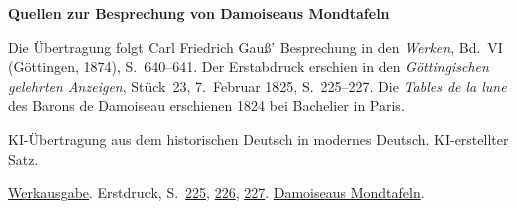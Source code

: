 \clearpage\thispagestyle{empty}
\begin{center}\Large\bfseries Quellen zur Besprechung von Damoiseaus Mondtafeln\end{center}

Die Übertragung folgt Carl Friedrich Gauß’ Besprechung in den \emph{Werken}, Bd.~VI (Göttingen, 1874), S.~640--641. Der Erstabdruck erschien in den \emph{Göttingischen gelehrten Anzeigen}, Stück~23, 7.~Februar 1825, S.~225--227. Die \emph{Tables de la lune} des Barons de Damoiseau erschienen 1824 bei Bachelier in Paris.

KI-Übertragung aus dem historischen Deutsch in modernes Deutsch. KI-erstellter Satz.

\href{https://gdz.sub.uni-goettingen.de/id/PPN236007467}{Werkausgabe}. Erstdruck, S.~\href{https://images.p.sub.uni-goettingen.de/iiif/image/gdz:PPN385030444_1825_1:00000225/full/1650,/0/default.jpg}{225}, \href{https://images.p.sub.uni-goettingen.de/iiif/image/gdz:PPN385030444_1825_1:00000226/full/1650,/0/default.jpg}{226}, \href{https://images.p.sub.uni-goettingen.de/iiif/image/gdz:PPN385030444_1825_1:00000227/full/1650,/0/default.jpg}{227}. \href{https://books.google.it/books?id=uixOAAAAYAAJ&pg=PR3}{Damoiseaus Mondtafeln}.

\clearpage
